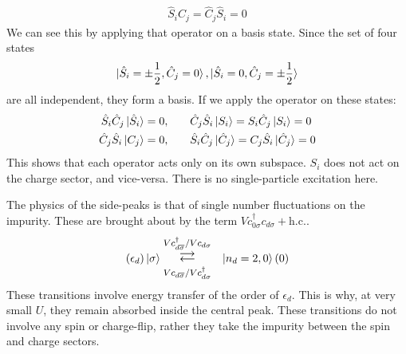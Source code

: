 \documentclass{report}
\numberwithin{equation}{section}
\begin{document}
\begin{equation}\begin{aligned}
	\hat S_i \hat C_j = \hat C_j \hat S_i = 0
\end{aligned}\end{equation}
We can see this by applying that operator on a basis state. Since the set of four states 
\begin{equation}\begin{aligned}
	\ket{\hat S_i = \pm \frac{1}{2}, \hat C_j = 0}, \ket{\hat S_i = 0, \hat C_j = \pm\frac{1}{2}}
\end{aligned}\end{equation}
are all independent, they form a basis. If we apply the operator on these states:
\begin{equation}\begin{aligned}
	\hat S_i \hat C_j \ket{\hat S_i} &= 0, &&&&\hat C_j \hat S_i \ket{S_i} = S_i \hat C_j \ket{S_i} = 0\\
	\hat C_j \hat S_i \ket{C_j} &= 0, &&&&\hat S_i \hat C_j \ket{\hat C_j} = C_j \hat S_i \ket{\hat C_j} = 0 \\
\end{aligned}\end{equation}
This shows that each operator acts only on its own subspace. \(S_i\) does not act on the charge sector, and vice-versa. There is no single-particle excitation here.

The physics of the side-peaks is that of single number fluctuations on the impurity. These are brought about by the term \(Vc^\dagger_{0\sigma}c_{d\sigma} + \text{h.c.}\).
\begin{equation}\begin{aligned}
	\left( \epsilon_d  \right) \ket{\sigma} & \mathrel{\mathlarger{\mathlarger{\mathop{\rightleftarrows}}^{V c^\dagger_{d\overline\sigma}/V c_{d\sigma}}_{V c_{d\overline\sigma}/V c^\dagger_{d\sigma}}}} &\ket{n_d=2,0} \left( 0 \right) \\
\end{aligned}\end{equation}
These transitions involve energy transfer of the order of \(\epsilon_d\). This is why, at very small \(U\), they remain absorbed inside the central peak. These transitions do not involve any spin or charge-flip, rather they take the impurity between the spin and charge sectors.
\end{document}
